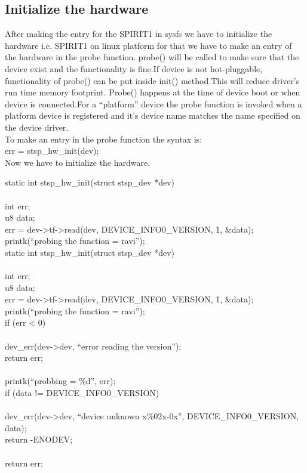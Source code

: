 \subsection{Initialize the hardware}
After making the entry for the SPIRIT1 in sysfs we have to initialize the hardware i.e. SPIRIT1 on linux platform for that we have to make an entry of the hardware in the probe function. probe() will be called to make sure that the device exist and the functionality is fine.If device is not hot-pluggable, functionality of probe() can be put inside init() method.This will reduce driver's run time memory footprint. Probe() happens at the time of device boot or when device is connected.For a ``platform'' device the probe function is invoked when a platform device is registered and it's device name matches the name specified on the device driver. \\
To make an entry in the probe function the syntax is: \\
              err = stsp\_hw\_init(dev);\\
	      Now we have to initialize the hardware. \\
	\begin{code}
	static int stsp\_hw\_init(struct stsp\_dev *dev)\\
	\lbrace \\
	int err;\\
        u8 data;\\
       err = dev->tf->read(dev, DEVICE\_INFO0\_VERSION, 1, &data);\\
        printk(``probing the function = ravi'');\\
	static int stsp\_hw\_init(struct stsp\_dev *dev)\\
	\lbrace \\
        int err;\\
        u8 data;\\
        err = dev->tf->read(dev, DEVICE\_INFO0\_VERSION, 1, &data);\\
        printk(``probing the function = ravi'');\\
        if (err < 0)\\
        \lbrace \\
         dev\_err(dev->dev, ``error reading the version\n'');\\
         return err;\\
        \rbrace \\
        printk(``probbing = \%d'', err);\\
        if (data != DEVICE\_INFO0\_VERSION)\\
 \lbrace \\
 dev\_err(dev->dev, ``device unknown \0x\%02x-0x'', DEVICE\_INFO0\_VERSION, data);\\
  return -ENODEV;\\
        \rbrace \\
        return err;\\
	\rbrace \\
	\end{code}
